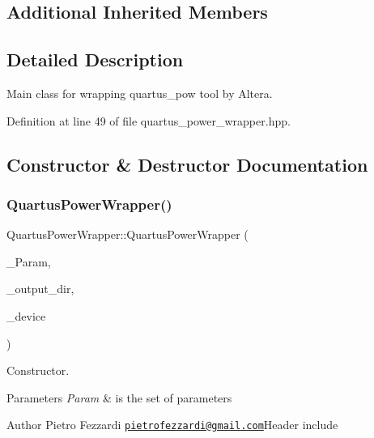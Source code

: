 \subsection*{Additional Inherited Members}


\subsection{Detailed Description}
Main class for wrapping quartus\+\_\+pow tool by Altera. 

Definition at line 49 of file quartus\+\_\+power\+\_\+wrapper.\+hpp.



\subsection{Constructor \& Destructor Documentation}
\mbox{\label{classQuartusPowerWrapper_a45fce7c49f4dbbb465a08bf761e89653}} 
\subsubsection{\texorpdfstring{Quartus\+Power\+Wrapper()}{QuartusPowerWrapper()}}
{\footnotesize\ttfamily Quartus\+Power\+Wrapper\+::\+Quartus\+Power\+Wrapper (\begin{DoxyParamCaption}\item[{const \hyperlink{Parameter_8hpp_a37841774a6fcb479b597fdf8955eb4ea}{Parameter\+Const\+Ref}}]{\+\_\+\+Param,  }\item[{const std\+::string \&}]{\+\_\+output\+\_\+dir,  }\item[{const \hyperlink{target__device_8hpp_acedb2b7a617e27e6354a8049fee44eda}{target\+\_\+device\+Ref}}]{\+\_\+device }\end{DoxyParamCaption})}



Constructor. 


\begin{DoxyParams}{Parameters}
{\em Param} & is the set of parameters\\
\hline
\end{DoxyParams}
\begin{DoxyAuthor}{Author}
Pietro Fezzardi \href{mailto:pietrofezzardi@gmail.com}{\tt pietrofezzardi@gmail.\+com}Header include 
\end{DoxyAuthor}



